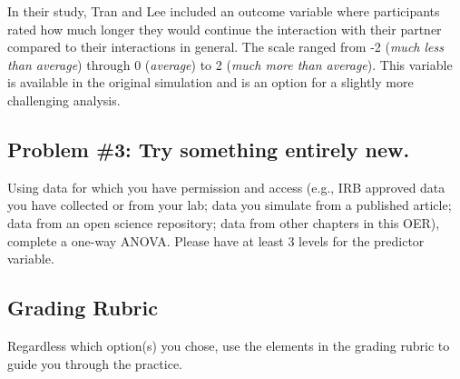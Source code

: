 \documentclass[
  11pt,
]{book}
\begin{document}
In their study, Tran and Lee \citeyearpar{tran_you_2014} included an outcome variable where participants rated how much longer they would continue the interaction with their partner compared to their interactions in general. The scale ranged from -2 (\emph{much less than average}) through 0 (\emph{average}) to 2 (\emph{much more than average}). This variable is available in the original simulation and is an option for a slightly more challenging analysis.

\hypertarget{problem-3-try-something-entirely-new.}{%
\subsection{Problem \#3: Try something entirely new.}\label{problem-3-try-something-entirely-new.}}

Using data for which you have permission and access (e.g., IRB approved data you have collected or from your lab; data you simulate from a published article; data from an open science repository; data from other chapters in this OER), complete a one-way ANOVA. Please have at least 3 levels for the predictor variable.

\hypertarget{grading-rubric-3}{%
\subsection{Grading Rubric}\label{grading-rubric-3}}

Regardless which option(s) you chose, use the elements in the grading rubric to guide you through the practice.
\end{document}
